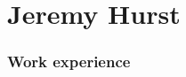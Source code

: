\documentclass[oldfontcommands]{tccv}
\begin{document}
\part{Jeremy Hurst}

%

\section{Work experience}
\end{document}
